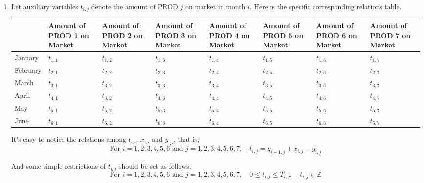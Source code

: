 \documentclass[12pt,a4paper]{article}
\makeatletter
\newtheorem*{solution}{Solution}
\theoremstyle{definition}
\renewenvironment{solution}[1][Solution] {\par\pushQED{\qed}\normalfont\topsep6\p@\@plus6\p@\relax\trivlist\item[\hskip\labelsep\bfseries#1\@addpunct{.}]\ignorespaces}{\popQED\endtrivlist\@endpefalse} \makeatother
\makeatother
\begin{document}
\begin{enumerate}
\begin{solution}
\begin{enumerate}
        Let auxiliary variables $t_{i,j}$ denote the amount of PROD $j$ on market in month $i$. Here is the specific corresponding relations table.
        \begin{table}[htbp]
    		\scriptsize
    		\centering
    		\renewcommand\arraystretch{1.1}
    		\begin{tabular}{m{} m{}<{\centering} m{}<{\centering} m{}<{\centering} m{}<{\centering} m{}<{\centering} m{}<{\centering} m{}<{\centering}}
    			\hline
    			& \textbf{Amount of PROD 1 on Market} & \textbf{Amount of PROD 2 on Market} & \textbf{Amount of PROD 3 on Market} & \textbf{Amount of PROD 4 on Market} & \textbf{Amount of PROD 5 on Market} & \textbf{Amount of PROD 6 on Market} &  \textbf{Amount of PROD 7 on Market} \\\hline
    			January & $t_{1,1}$ & $t_{1,2}$ & $t_{1,3}$ & $t_{1,4}$ & $t_{1,5}$ & $t_{1,6}$ & $t_{1,7}$ \\
    			February & $t_{2,1}$ & $t_{2,2}$ & $t_{2,3}$ & $t_{2,4}$ & $t_{2,5}$ & $t_{2,6}$ & $t_{2,7}$ \\
    			March & $t_{3,1}$ & $t_{3,2}$ & $t_{3,3}$ & $t_{3,4}$ & $t_{3,5}$ & $t_{3,6}$ & $t_{3,7}$ \\
    			April & $t_{4,1}$ & $t_{3,2}$ & $t_{4,3}$ & $t_{4,4}$ & $t_{4,5}$ & $t_{4,6}$ & $t_{4,7}$ \\
    			May & $t_{5,1}$ & $t_{5,2}$ & $t_{5,3}$ & $t_{5,4}$ & $t_{5,5}$ & $t_{5,6}$ & $t_{5,7}$ \\
    			June & $t_{6,1}$ & $t_{6,2}$ & $t_{6,3}$ & $t_{6,4}$ & $t_{6,5}$ & $t_{6,6}$ & $t_{6,7}$ \\
    			\hline
    		\end{tabular}
    	\end{table}

        It's easy to notice the relations among $t_{\cdot, \cdot}$, $x_{\cdot, \cdot}$ and $y_{\cdot, \cdot}$, that is,
        \begin{equation}
        \textrm{For\ } i = 1,2,3,4,5,6 \textrm{\ and\ } j = 1,2,3,4,5,6,7,\quad t_{i,j} = y_{i-1, j} + x_{i,j} - y_{i, j}
        \label{rest2}
        \end{equation}

        And some simple restrictions of $t_{i,j}$ should be set as follows.
        \begin{equation}
        \textrm{For\ } i = 1,2,3,4,5,6 \textrm{\ and\ } j = 1,2,3,4,5,6,7,\quad 0 \leq t_{i,j} \leq T_{i,j}, \quad t_{i,j} \in \mathbb{Z}
        \label{rest3}
        \end{equation}


\end{enumerate}
\end{solution}
\end{enumerate}
\end{document}
